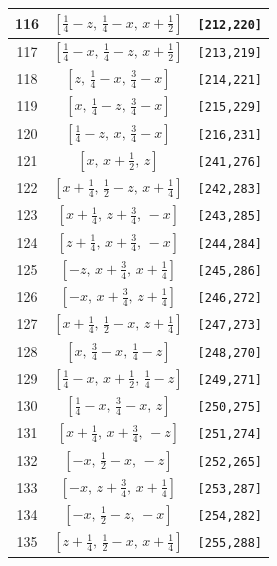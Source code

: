 \documentclass[fleqn,8pt]{jsarticle}
\begin{document}
\begin{longtable}{ccc}
116 & $\left[ \frac{1}{4} - z,\, \frac{1}{4} - x,\, x + \frac{1}{2} \right]$ & {\tt [212,220]} \\ \hline
117 & $\left[ \frac{1}{4} - x,\, \frac{1}{4} - z,\, x + \frac{1}{2} \right]$ & {\tt [213,219]} \\ \hline
118 & $\left[ z,\, \frac{1}{4} - x,\, \frac{3}{4} - x \right]$ & {\tt [214,221]} \\ \hline
119 & $\left[ x,\, \frac{1}{4} - z,\, \frac{3}{4} - x \right]$ & {\tt [215,229]} \\ \hline
120 & $\left[ \frac{1}{4} - z,\, x,\, \frac{3}{4} - x \right]$ & {\tt [216,231]} \\ \hline
121 & $\left[ x,\, x + \frac{1}{2},\, z \right]$ & {\tt [241,276]} \\ \hline
122 & $\left[ x + \frac{1}{4},\, \frac{1}{2} - z,\, x + \frac{1}{4} \right]$ & {\tt [242,283]} \\ \hline
123 & $\left[ x + \frac{1}{4},\, z + \frac{3}{4},\, - x \right]$ & {\tt [243,285]} \\ \hline
124 & $\left[ z + \frac{1}{4},\, x + \frac{3}{4},\, - x \right]$ & {\tt [244,284]} \\ \hline
125 & $\left[ - z,\, x + \frac{3}{4},\, x + \frac{1}{4} \right]$ & {\tt [245,286]} \\ \hline
126 & $\left[ - x,\, x + \frac{3}{4},\, z + \frac{1}{4} \right]$ & {\tt [246,272]} \\ \hline
127 & $\left[ x + \frac{1}{4},\, \frac{1}{2} - x,\, z + \frac{1}{4} \right]$ & {\tt [247,273]} \\ \hline
128 & $\left[ x,\, \frac{3}{4} - x,\, \frac{1}{4} - z \right]$ & {\tt [248,270]} \\ \hline
129 & $\left[ \frac{1}{4} - x,\, x + \frac{1}{2},\, \frac{1}{4} - z \right]$ & {\tt [249,271]} \\ \hline
130 & $\left[ \frac{1}{4} - x,\, \frac{3}{4} - x,\, z \right]$ & {\tt [250,275]} \\ \hline
131 & $\left[ x + \frac{1}{4},\, x + \frac{3}{4},\, - z \right]$ & {\tt [251,274]} \\ \hline
132 & $\left[ - x,\, \frac{1}{2} - x,\, - z \right]$ & {\tt [252,265]} \\ \hline
133 & $\left[ - x,\, z + \frac{3}{4},\, x + \frac{1}{4} \right]$ & {\tt [253,287]} \\ \hline
134 & $\left[ - x,\, \frac{1}{2} - z,\, - x \right]$ & {\tt [254,282]} \\ \hline
135 & $\left[ z + \frac{1}{4},\, \frac{1}{2} - x,\, x + \frac{1}{4} \right]$ & {\tt [255,288]} \\ \hline

\end{longtable}
\end{document}
